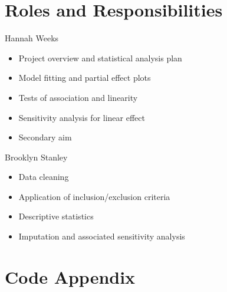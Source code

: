 \documentclass[10pt]{article}\usepackage[]{graphicx}\usepackage[]{color}
\begin{document}
\section{Roles and Responsibilities}

Hannah Weeks\\
\begin{itemize}
  \item Project overview and statistical analysis plan
  \item Model fitting and partial effect plots
  \item Tests of association and linearity
  \item Sensitivity analysis for linear effect
  \item Secondary aim
\end{itemize}

Brooklyn Stanley\\
\begin{itemize}
  \item Data cleaning
  \item Application of inclusion/exclusion criteria
  \item Descriptive statistics
  \item Imputation and associated sensitivity analysis
\end{itemize}

\clearpage
\section{Code Appendix}
\end{document}
